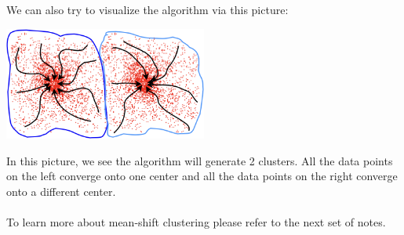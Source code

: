 \documentclass{article}
\begin{document}
We can also try to visualize the algorithm via this picture:
\begin{center}
\centering
\includegraphics[width=0.5\textwidth]{mean-shift.png}
\end{center}
In this picture, we see the algorithm will generate 2 clusters. All the data points on the left converge onto one center and all the data points on the right converge onto a different center.
\\~\\
To learn more about mean-shift clustering please refer to the next set of notes.

\small


\end{document}

